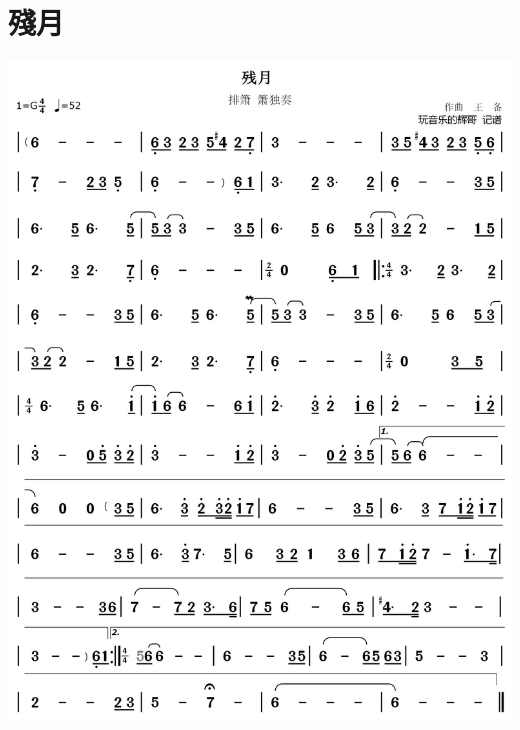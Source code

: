 \documentclass[cn,pad,twocol]{elegantbook}
\begin{document}
\section{殘月}      \includegraphics[width=\textwidth]{dongxiao/20201231-残月}
\end{document}
